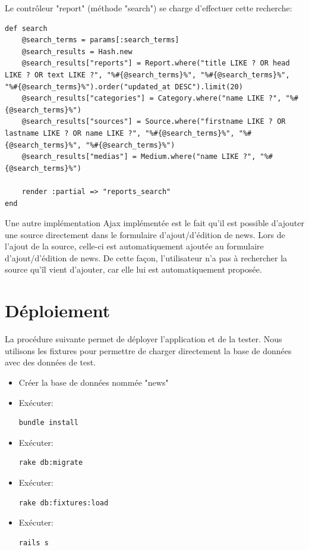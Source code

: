 \documentclass{article}
\begin{document}
Le contrôleur "report" (méthode "search") se charge d'effectuer cette recherche:

\begin{lstlisting}
def search
	@search_terms = params[:search_terms]
	@search_results = Hash.new
	@search_results["reports"] = Report.where("title LIKE ? OR head LIKE ? OR text LIKE ?", "%#{@search_terms}%", "%#{@search_terms}%", "%#{@search_terms}%").order("updated_at DESC").limit(20)
	@search_results["categories"] = Category.where("name LIKE ?", "%#{@search_terms}%")
	@search_results["sources"] = Source.where("firstname LIKE ? OR lastname LIKE ? OR name LIKE ?", "%#{@search_terms}%", "%#{@search_terms}%", "%#{@search_terms}%")
	@search_results["medias"] = Medium.where("name LIKE ?", "%#{@search_terms}%")
	
	render :partial => "reports_search"
end
\end{lstlisting}

Une autre implémentation Ajax implémentée est le fait qu'il est possible d'ajouter une source directement dans le formulaire d'ajout/d'édition de news.
Lors de l'ajout de la source, celle-ci est automatiquement ajoutée au formulaire d'ajout/d'édition de news.
De cette façon, l'utilisateur n'a pas à rechercher la source qu'îl vient d'ajouter, car elle lui est automatiquement proposée.

\newpage
\section{Déploiement}

La procédure suivante permet de déployer l'application et de la tester. Nous utilisons les fixtures pour permettre de charger directement la base de données avec des données de test.

\begin{itemize}
\item Créer la base de données nommée "news"
\item Exécuter: \begin{verbatim}bundle install\end{verbatim}
\item Exécuter: \begin{verbatim}rake db:migrate\end{verbatim}
\item Exécuter: \begin{verbatim}rake db:fixtures:load\end{verbatim}
\item Exécuter: \begin{verbatim}rails s\end{verbatim}
\end{itemize}
\end{document}

